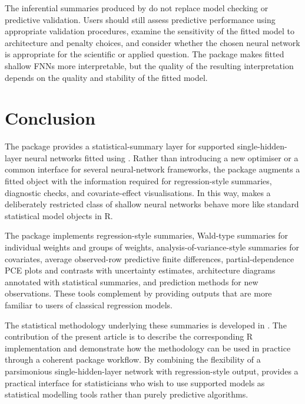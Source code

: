 The inferential summaries produced by  do not replace model checking or predictive validation.
Users should still assess predictive performance using appropriate validation procedures, examine the sensitivity of the fitted model to architecture and penalty choices, and consider whether the chosen neural network is appropriate for the scientific or applied question.
The package makes fitted shallow FNNs more interpretable, but the quality of the resulting interpretation depends on the quality and stability of the fitted model.

\section{Conclusion}\label{sec:conclusion}

The  package provides a statistical-summary layer for supported single-hidden-layer neural networks fitted using .
Rather than introducing a new optimiser or a common interface for several neural-network frameworks, the package augments a fitted  object with the information required for regression-style summaries, diagnostic checks, and covariate-effect visualisations.
In this way,  makes a deliberately restricted class of shallow neural networks behave more like standard statistical model objects in R.

The package implements regression-style summaries, Wald-type summaries for individual weights and groups of weights, analysis-of-variance-style summaries for covariates, average observed-row predictive finite differences, partial-dependence PCE plots and contrasts with uncertainty estimates, architecture diagrams annotated with statistical summaries, and prediction methods for new observations.
These tools complement  by providing outputs that are more familiar to users of classical regression models.

The statistical methodology underlying these summaries is developed in \citet{mcinerney2023feedforward}.
The contribution of the present article is to describe the corresponding R implementation and demonstrate how the methodology can be used in practice through a coherent package workflow.
By combining the flexibility of a parsimonious single-hidden-layer network with regression-style output,  provides a practical interface for statisticians who wish to use supported  models as statistical modelling tools rather than purely predictive algorithms.

